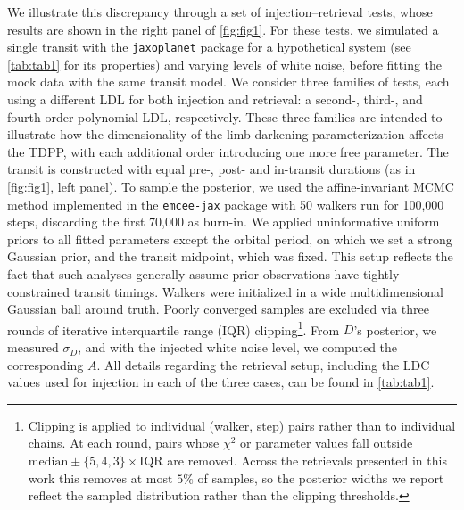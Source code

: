 \documentclass[twocolumn]{aastex631}
\newcommand{\vtwo}[1]{{#1}}
\begin{document}
We illustrate this discrepancy through a set of injection--retrieval tests, whose results are shown in the right panel of \autoref{fig:fig1}. For these tests, we simulated a single transit with the \texttt{jaxoplanet} package \citep{jaxoplanet} for a hypothetical system (see \autoref{tab:tab1} for its properties) and varying levels of white noise, before fitting the mock data with the same transit model. We consider three families of tests, each using a different LDL for both injection and retrieval: a second-, third-, and fourth-order polynomial LDL, respectively. These three families are intended to illustrate how the dimensionality of the limb-darkening parameterization affects the TDPP, with each additional order introducing one more free parameter. The transit is constructed with equal pre-, post- and in-transit durations (as in \autoref{fig:fig1}, left panel). To sample the posterior, we used the affine\vtwo{-}invariant MCMC method implemented in the \texttt{emcee-jax} package \citep[a JAX implementation of \texttt{emcee},][]{emcee} with 50 walkers run for 100,000 steps, discarding the first 70,000 as burn-in. We applied uninformative uniform priors to all fitted parameters except the orbital period, on which we set a strong Gaussian prior, and the transit midpoint, which was fixed. This setup reflects the fact that such analyses generally assume prior observations have tightly constrained transit timings. Walkers were initialized in a wide multidimensional Gaussian ball around truth. Poorly converged samples are excluded via three rounds of iterative interquartile range (IQR) clipping\footnote{Clipping is applied to individual (walker, step) pairs rather than to individual chains. At each round, pairs whose $\chi^2$ or parameter values fall outside $\mathrm{median} \pm \{5, 4, 3\} \times \mathrm{IQR}$ are removed. \vtwo{Across the retrievals presented in this work this removes at most $5\%$ of samples, so the posterior widths we report reflect the sampled distribution rather than the clipping thresholds.}}. From $D$'s posterior, we measured $\sigma_D$, and with the injected white noise level, we computed the corresponding $A$. All details regarding the retrieval setup, including the LDC values used for injection in each of the three cases, can be found in \autoref{tab:tab1}.
\end{document}
